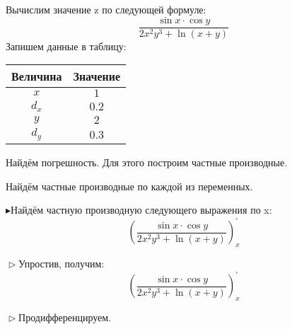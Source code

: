 \documentclass[12pt]{article}
\begin{document}
Вычислим значение z по следующей формуле:
\begin{dmath*}
 \frac {\sin x \cdot \cos y} {2x^{2}y^{3} + \ln\left(x + y\right)} \end{dmath*}
Запишем данные в таблицу:

\begin{tabular}{|c|c|}
 \hline
 Величина&Значение\\
 \hline
$x$&$1$\\
\hline
$d_x$&$0.2$\\
\hline
$y$&$2$\\
\hline
$d_y$&$0.3$\\
\hline
\end{tabular}

Найдём погрешность. Для этого построим частные производные.

Найдём частные производные по каждой из переменных.

$\blacktriangleright$Найдём частную производную следующего выражения по x:
                             \begin{dmath*}
                             \left( \frac {\sin x \cdot \cos y} {2x^{2}y^{3} + \ln\left(x + y\right)} \right)_{x}^{\prime}
                             \end{dmath*}

$\vartriangleright$Упростив, получим: 
                             \begin{dmath*}
                             \left( \frac {\sin x \cdot \cos y} {2x^{2}y^{3} + \ln\left(x + y\right)} \right)_{x}^{\prime}
                             \end{dmath*}

$\vartriangleright$Продифференцируем.
\end{document}
